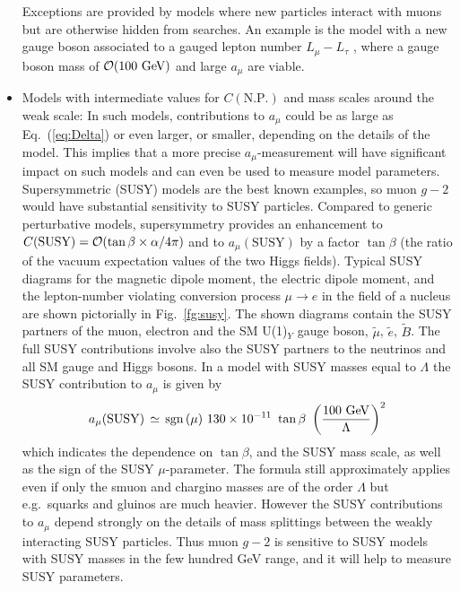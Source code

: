 \begin{itemize}
Exceptions are provided by models where new particles
interact with muons but are otherwise hidden from searches. An example
is the model with a new gauge boson associated to a gauged lepton
number $L_\mu-L_\tau$ \cite{LmuLtau}, where a gauge boson mass of
${\cal O}(100\mbox{ GeV})$ and large $a_\mu$ are viable.
\item Models with intermediate values for $C(\mbox{N.P.})$ and mass
  scales around the weak scale: In such
  models, contributions to $a_\mu$ could be as large as
  Eq.~(\ref{eq:Delta}) or even larger, or smaller, depending on the
  details of the model. This implies that a more precise
  $a_\mu$-measurement will have significant impact on such models and
  can even be used to measure model parameters. Supersymmetric (SUSY) models
  are the best known examples, so muon $g-2$ would have substantial
  sensitivity to
 SUSY particles.
Compared to generic perturbative models,
supersymmetry provides an enhancement to $C(\mbox{SUSY})={\cal
  O}(\tan\beta\times\alpha/4\pi)$
and to $ a_\mu(\mbox{SUSY})$ by a factor $\tan\beta$ (the ratio of
the vacuum expectation values of the two Higgs fields). Typical SUSY
diagrams for the magnetic dipole moment, the electric dipole moment,
and the lepton-number violating conversion process $\mu \rightarrow
e$ in the field of a nucleus are shown pictorially in
Fig.~\ref{fg:susy}. The shown diagrams contain the SUSY partners of
the muon, electron and the SM U(1)$_Y$ gauge boson, $\tilde{\mu}$,
$\tilde{e}$, $\tilde{B}$. The full SUSY contributions involve also the
SUSY partners to the neutrinos and all SM gauge and Higgs bosons. In a
model with SUSY masses equal to $\Lambda$ 
the SUSY contribution to $a_{\mu}$ is given
by~\cite{czmar} \begin{equation} \label{amususy}
 a_{\mu}({\rm SUSY})\, \simeq \,{\rm sgn}\, (\mu) \ 130 \times 10^{-11}\ \tan \beta\
\left({100\ {\rm GeV}  \over \Lambda}\right)^2
\end{equation}
which indicates the dependence on $\tan \beta$,
and the SUSY mass scale,  as well as the sign of the
SUSY $\mu$-parameter. The formula still approximately applies even if
only the smuon and chargino masses are of the order $\Lambda$
but e.g.\ squarks and gluinos are much heavier. However the SUSY
contributions to $a_\mu$ depend strongly on the details of mass
splittings between the weakly interacting SUSY particles.
Thus muon $g-2$ is sensitive to  SUSY models with SUSY masses
in the few hundred GeV range, and it will help to measure SUSY
parameters. 


\end{itemize}
